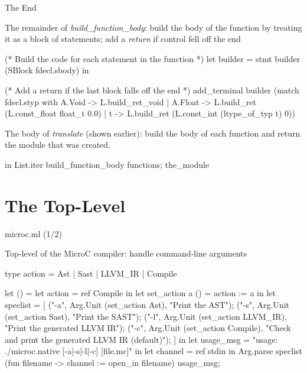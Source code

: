 \documentclass{plt}
\begin{document}
\begin{frame}[fragile=singleslide]{The End}

The remainder of \emph{build\_function\_body}: build the body of the
function by treating it as a block of statements; add a \emph{return}
if control fell off the end

\begin{ocaml}
    (* Build the code for each statement in the function *)
    let builder = stmt builder (SBlock fdecl.sbody) in

    (* Add a return if the last block falls off the end *)
    add_terminal builder (match fdecl.styp with
        A.Void -> L.build_ret_void
      | A.Float -> L.build_ret (L.const_float float_t 0.0)
      | t -> L.build_ret (L.const_int (ltype_of_typ t) 0))
\end{ocaml}

The body of \emph{translate} (shown earlier): build the body of each
function and return the module that was created.

\begin{ocaml}
  in
  List.iter build_function_body functions;
  the_module
\end{ocaml}

\end{frame}

\part{The Top-Level}
\frame{\partpage}

\begin{frame}[fragile=singleslide]{microc.ml (1/2)}

Top-level of the MicroC compiler: handle command-line arguments

\begin{ocaml}
type action = Ast | Sast | LLVM_IR | Compile

let () =
  let action = ref Compile in
  let set_action a () = action := a in
  let speclist = [
    ("-a", Arg.Unit (set_action Ast), "Print the AST");
    ("-s", Arg.Unit (set_action Sast), "Print the SAST");
    ("-l", Arg.Unit (set_action LLVM_IR),
                          "Print the generated LLVM IR");
    ("-c", Arg.Unit (set_action Compile),
      "Check and print the generated LLVM IR (default)");
  ] in  
  let usage_msg = "usage: ./microc.native [-a|-s|-l|-c] [file.mc]" in
  let channel = ref stdin in
  Arg.parse speclist
      (fun filename -> channel := open_in filename) usage_msg;
\end{ocaml}
\end{frame}
\end{document}
